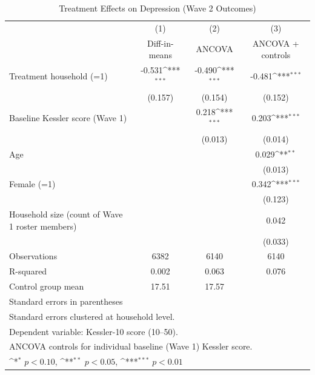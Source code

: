 \begin{table}[htbp]\centering
\def\sym#1{\ifmmode^{#1}\else\(^{#1}\)\fi}
\caption{Treatment Effects on Depression (Wave 2 Outcomes)}
\begin{tabular}{l*{3}{c}}
\toprule
                    &\multicolumn{1}{c}{(1)}&\multicolumn{1}{c}{(2)}&\multicolumn{1}{c}{(3)}\\
                    &\multicolumn{1}{c}{Diff-in-means}&\multicolumn{1}{c}{ANCOVA}&\multicolumn{1}{c}{ANCOVA + controls}\\
\midrule
Treatment household (=1)&      -0.531\sym{***}&      -0.490\sym{***}&      -0.481\sym{***}\\
                    &     (0.157)         &     (0.154)         &     (0.152)         \\
\addlinespace
Baseline Kessler score (Wave 1)&                     &       0.218\sym{***}&       0.203\sym{***}\\
                    &                     &     (0.013)         &     (0.014)         \\
\addlinespace
Age                 &                     &                     &       0.029\sym{**} \\
                    &                     &                     &     (0.013)         \\
\addlinespace
Female (=1)         &                     &                     &       0.342\sym{***}\\
                    &                     &                     &     (0.123)         \\
\addlinespace
Household size (count of Wave 1 roster members)&                     &                     &       0.042         \\
                    &                     &                     &     (0.033)         \\
\midrule
Observations        &        6382         &        6140         &        6140         \\
R-squared           &       0.002         &       0.063         &       0.076         \\
Control group mean  &       17.51         &       17.57         &                     \\
\bottomrule
\multicolumn{4}{l}{\footnotesize Standard errors in parentheses}\\
\multicolumn{4}{l}{\footnotesize Standard errors clustered at household level.}\\
\multicolumn{4}{l}{\footnotesize Dependent variable: Kessler-10 score (10–50).}\\
\multicolumn{4}{l}{\footnotesize ANCOVA controls for individual baseline (Wave 1) Kessler score.}\\
\multicolumn{4}{l}{\footnotesize \sym{*} \(p<0.10\), \sym{**} \(p<0.05\), \sym{***} \(p<0.01\)}\\
\end{tabular}
\end{table}
